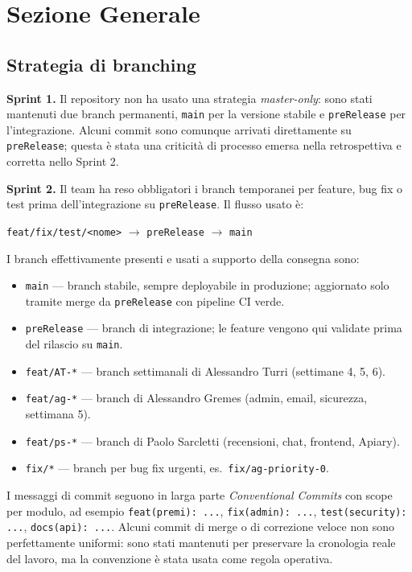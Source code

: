 \documentclass[11pt,a4paper]{article}
\newcommand{\code}[1]{\texttt{#1}}
\begin{document}
\section{Sezione Generale}

\subsection{Strategia di branching}

\textbf{Sprint 1.} Il repository non ha usato una strategia \textit{master-only}: sono stati mantenuti due branch permanenti, \code{main} per la versione stabile e \code{preRelease} per l'integrazione. Alcuni commit sono comunque arrivati direttamente su \code{preRelease}; questa è stata una criticità di processo emersa nella retrospettiva e corretta nello Sprint 2.

\textbf{Sprint 2.} Il team ha reso obbligatori i branch temporanei per feature, bug fix o test prima dell'integrazione su \code{preRelease}. Il flusso usato è:
\begin{center}
\code{feat/fix/test/<nome>} $\rightarrow$ \code{preRelease} $\rightarrow$ \code{main}
\end{center}

I branch effettivamente presenti e usati a supporto della consegna sono:

\begin{itemize}[noitemsep]
  \item \code{main} --- branch stabile, sempre deployabile in produzione; aggiornato solo tramite merge da \code{preRelease} con pipeline CI verde.
  \item \code{preRelease} --- branch di integrazione; le feature vengono qui validate prima del rilascio su \code{main}.
  \item \code{feat/AT-*} --- branch settimanali di Alessandro Turri (settimane 4, 5, 6).
  \item \code{feat/ag-*} --- branch di Alessandro Gremes (admin, email, sicurezza, settimana 5).
  \item \code{feat/ps-*} --- branch di Paolo Sarcletti (recensioni, chat, frontend, Apiary).
  \item \code{fix/*} --- branch per bug fix urgenti, es.\ \code{fix/ag-priority-0}.
\end{itemize}

I messaggi di commit seguono in larga parte \textit{Conventional Commits} con scope per modulo, ad esempio \code{feat(premi): ...}, \code{fix(admin): ...}, \code{test(security): ...}, \code{docs(api): ...}. Alcuni commit di merge o di correzione veloce non sono perfettamente uniformi: sono stati mantenuti per preservare la cronologia reale del lavoro, ma la convenzione è stata usata come regola operativa.
\end{document}
